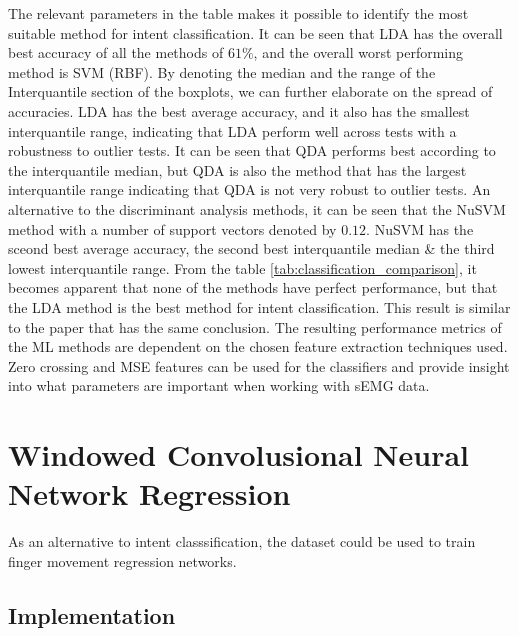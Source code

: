 \documentclass[../main.tex]{subfiles}
\begin{document}
The relevant parameters in the table makes it possible to identify the most suitable method for intent classification.
It can be seen that LDA has the overall best accuracy of all the methods of $61\%$, and the overall worst performing method is SVM (RBF).
By denoting the median and the range of the Interquantile section of the boxplots, we can further elaborate on the spread of accuracies.
LDA has the best average accuracy, and it also has the smallest interquantile range, indicating that LDA perform well across tests with a robustness to outlier tests. 
It can be seen that QDA performs best according to the interquantile median, but QDA is also the method that has the largest interquantile range indicating that QDA is not very robust to outlier tests.
An alternative to the discriminant analysis methods, it can be seen that the NuSVM method with a number of support vectors denoted by $0.12$.
NuSVM has the sceond best average accuracy, the second best interquantile median \& the third lowest interquantile range.
From the table \ref{tab:classification_comparison}, it becomes apparent that none of the methods have perfect performance, but that the LDA method is the best method for intent classification.
This result is similar to the paper \cite{??} that has the same conclusion.
The resulting performance metrics of the ML methods are dependent on the chosen feature extraction techniques used.
Zero crossing and MSE features can be used for the classifiers and provide insight into what parameters are important when working with sEMG data.

\section{Windowed Convolusional Neural Network Regression}

As an alternative to intent classsification, the dataset could be used to train finger movement regression networks.

\subsection{Implementation}
\end{document}
